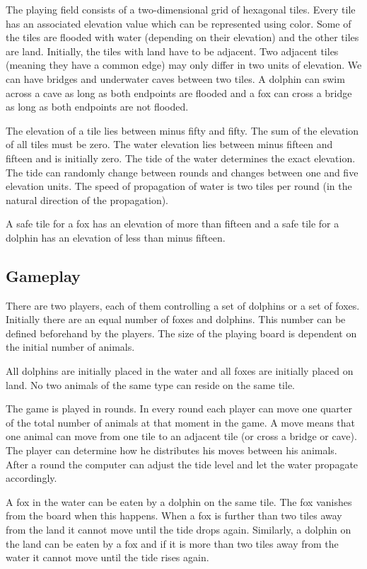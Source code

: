 \documentclass[12pt]{article}
\begin{document}
The playing field consists of a two-dimensional grid of hexagonal tiles. Every tile has an associated elevation value which can be represented using color. Some of the tiles are flooded with water (depending on their elevation) and the other tiles are land. Initially, the tiles with land have to be adjacent. Two adjacent tiles (meaning they have a common edge) may only differ in two units of elevation. We can have bridges and underwater caves between two tiles. A dolphin can swim across a cave as long as both endpoints are flooded and a fox can cross a bridge as long as both endpoints are not flooded.

The elevation of a tile lies between minus fifty and fifty. The sum of the elevation of all tiles must be zero. The water elevation lies between minus fifteen and fifteen and is initially zero. The tide of the water determines the exact elevation. The tide can randomly change between rounds and changes between one and five elevation units. The speed of propagation of water is two tiles per round (in the natural direction of the propagation).

A safe tile for a fox has an elevation of more than fifteen and a safe tile for a dolphin has an elevation of less than minus fifteen.

\subsection{Gameplay}
There are two players, each of them controlling a set of dolphins or a set of foxes. Initially there are an equal number of foxes and dolphins. This number can be defined beforehand by the players. The size of the playing board is dependent on the initial number of animals.

All dolphins are initially placed in the water and all foxes are initially placed on land. No two animals of the same type can reside on the same tile.

The game is played in rounds. In every round each player can move one quarter of the total number of animals at that moment in the game. A move means that one animal can move from one tile to an adjacent tile (or cross a bridge or cave). The player can determine how he distributes his moves between his animals. After a round the computer can adjust the tide level and let the water propagate accordingly.

A fox in the water can be eaten by a dolphin on the same tile. The fox vanishes from the board when this happens. When a fox is further than two tiles away from the land it cannot move until the tide drops again. Similarly, a dolphin on the land can be eaten by a fox and if it is more than two tiles away from the water it cannot move until the tide rises again.
\end{document}
